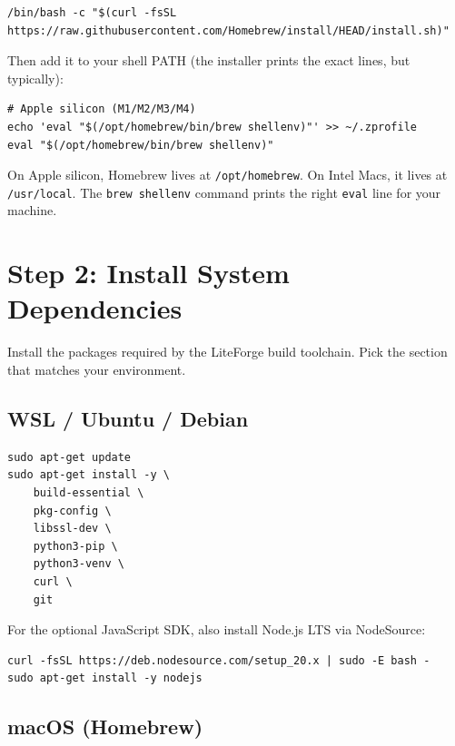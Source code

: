 \documentclass[11pt,letterpaper]{article}
\begin{document}
\begin{lstlisting}[style=bash]
/bin/bash -c "$(curl -fsSL https://raw.githubusercontent.com/Homebrew/install/HEAD/install.sh)"
\end{lstlisting}

Then add it to your shell PATH (the installer prints the exact lines, but
typically):

\begin{lstlisting}[style=bash]
# Apple silicon (M1/M2/M3/M4)
echo 'eval "$(/opt/homebrew/bin/brew shellenv)"' >> ~/.zprofile
eval "$(/opt/homebrew/bin/brew shellenv)"
\end{lstlisting}

\begin{tcolorbox}[notebox={Apple silicon vs Intel}]
On Apple silicon, Homebrew lives at \texttt{/opt/homebrew}. On Intel
Macs, it lives at \texttt{/usr/local}. The \texttt{brew shellenv} command
prints the right \texttt{eval} line for your machine.
\end{tcolorbox}

\newpage
\section{Step 2: Install System Dependencies}

Install the packages required by the LiteForge build toolchain. Pick the
section that matches your environment.

\subsection{WSL / Ubuntu / Debian}

\begin{lstlisting}[style=bash]
sudo apt-get update
sudo apt-get install -y \
    build-essential \
    pkg-config \
    libssl-dev \
    python3-pip \
    python3-venv \
    curl \
    git
\end{lstlisting}

For the optional JavaScript SDK, also install Node.js LTS via NodeSource:

\begin{lstlisting}[style=bash]
curl -fsSL https://deb.nodesource.com/setup_20.x | sudo -E bash -
sudo apt-get install -y nodejs
\end{lstlisting}

\subsection{macOS (Homebrew)}
\end{document}
